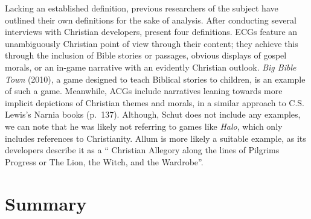 Lacking an established definition, previous researchers of the subject have outlined their own definitions for the sake of analysis. After conducting several interviews with Christian developers, \textcite{schut_making_2013} present four definitions. \acp{ECG} feature an unambiguously Christian point of view through their content; they achieve this through the inclusion of Bible stories or passages, obvious displays of gospel morals, or an in-game narrative with an evidently Christian outlook. \textit{Big Bible Town} (2010), a game designed to teach Biblical stories to children, is an example of such a game. Meanwhile, \acp{ACG} include narratives leaning towards more implicit depictions of Christian themes and morals, in a similar approach to C.S. Lewis's Narnia books (p.\ 137). Although, Schut does not include any examples, we can note that he was likely not referring to games like \textit{Halo}, which only includes references to Christianity. Allum is more likely a suitable example, as its developers describe it as a `` Christian Allegory along the lines of Pilgrims Progress or The Lion, the Witch, and the Wardrobe''.
\section{Summary}
\blindtext
